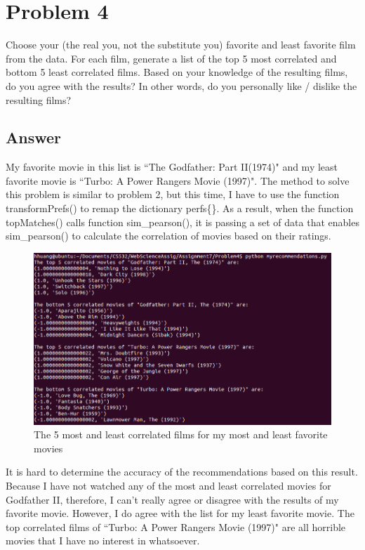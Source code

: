 \documentclass[12pt]{article}
\begin{document}


\section*{Problem 4}

Choose your (the real you, not the substitute you) favorite and
least favorite film from the data.  For each film, generate a list
of the top 5 most correlated and bottom 5 least correlated films.
Based on your knowledge of the resulting films, do you agree with
the results?  In other words, do you personally like / dislike
the resulting films?

\subsection*{Answer}

My favorite movie in this list is ``The Godfather: Part II(1974)" and my least favorite movie is ``Turbo: A Power Rangers Movie (1997)". The method to solve this problem is similar to problem 2, but this time, I have to use the function transformPrefs() to remap the dictionary perfs\{\}. As a result, when the function topMatches() calls function sim\_pearson(), it is passing a set of data that enables sim\_pearson() to calculate the correlation of movies based on their ratings. 

\begin{figure}[h]
\centering
\includegraphics[width=6.5in]{myrecommendations.png}
\caption{The 5 most and least correlated films for my most and least favorite movies}
\end{figure}



It is hard to determine the accuracy of the recommendations based on this result. Because I have not watched any of the most and least correlated movies for Godfather II, therefore, I can't really agree or disagree with the results of my favorite movie. However, I do agree with the list for my least favorite movie. The top correlated films of ``Turbo: A Power Rangers Movie (1997)" are all horrible movies that I have no interest in whatsoever. 
\end{document}
